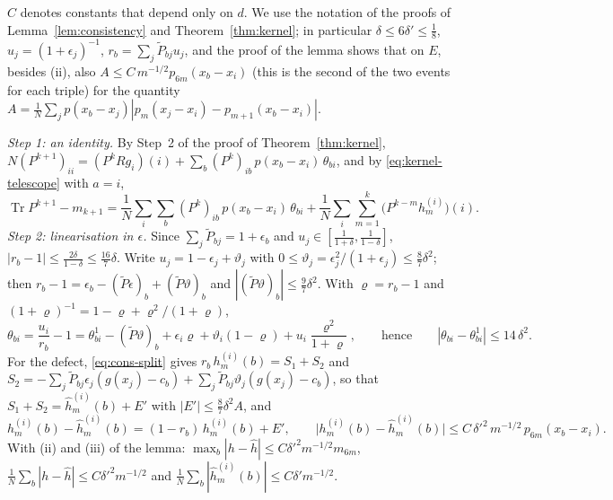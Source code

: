 \documentclass[11pt,a4paper]{article}
\makeatletter
\theoremstyle{stmt}
\theoremstyle{defn}
\theoremstyle{rmk}
\renewenvironment{proof}[1][\proofname]{\par\pushQED{\qed}\normalfont\topsep6\p@\@plus6\p@\relax
  \trivlist\item[\hskip\labelsep{\sffamily\itshape\small #1.}]\ignorespaces}{\popQED\endtrivlist\@endpefalse}
\numberwithin{equation}{section}
\DeclareMathOperator{\Tr}{Tr}
\makeatother
\begin{document}
{\begin{proof}
$C$ denotes constants that depend only on $d$. We use the notation of the proofs of Lemma~\ref{lem:consistency} and Theorem~\ref{thm:kernel}; in particular $\delta\le6\delta'\le\frac18$, $u_j=(1+\epsilon_j)^{-1}$, $r_b=\sum_j\tilde P_{bj}u_j$, and the proof of the lemma shows that on $E$, besides (ii), also $A\le C\,m^{-1/2}p_{6m}(x_b-x_i)$ (this is the second of the two events for each triple) for the quantity $A=\frac1N\sum_jp(x_b-x_j)|p_m(x_j-x_i)-p_{m+1}(x_b-x_i)|$.

\emph{Step 1: an identity.} By Step~2 of the proof of Theorem~\ref{thm:kernel}, $N(P^{k+1})_{ii}=(P^kRg_i)(i)+\sum_b(P^k)_{ib}\,p(x_b-x_i)\,\theta_{bi}$, and by \eqref{eq:kernel-telescope} with $a=i$,
\[
\Tr P^{k+1}-m_{k+1}=\frac1N\sum_i\sum_b(P^k)_{ib}\,p(x_b-x_i)\,\theta_{bi}+\frac1N\sum_i\sum_{m=1}^k\big(P^{k-m}h^{(i)}_m\big)(i).
\]
\emph{Step 2: linearisation in $\epsilon$.} Since $\sum_j\tilde P_{bj}=1+\epsilon_b$ and $u_j\in[\frac1{1+\delta},\frac1{1-\delta}]$, $|r_b-1|\le\frac{2\delta}{1-\delta}\le\frac{16}7\delta$. Write $u_j=1-\epsilon_j+\vartheta_j$ with $0\le\vartheta_j=\epsilon_j^2/(1+\epsilon_j)\le\frac87\delta^2$; then $r_b-1=\epsilon_b-(\tilde P\epsilon)_b+(\tilde P\vartheta)_b$ and $|(\tilde P\vartheta)_b|\le\frac97\delta^2$. With $\varrho=r_b-1$ and $(1+\varrho)^{-1}=1-\varrho+\varrho^2/(1+\varrho)$,
\[
\theta_{bi}=\frac{u_i}{r_b}-1=\theta^1_{bi}-(\tilde P\vartheta)_b+\epsilon_i\varrho+\vartheta_i(1-\varrho)+u_i\frac{\varrho^2}{1+\varrho},\qquad\text{hence}\qquad|\theta_{bi}-\theta^1_{bi}|\le14\,\delta^2 .
\]
For the defect, \eqref{eq:cons-split} gives $r_b\,h^{(i)}_m(b)=S_1+S_2$ and $S_2=-\sum_j\tilde P_{bj}\epsilon_j(g(x_j)-c_b)+\sum_j\tilde P_{bj}\vartheta_j(g(x_j)-c_b)$, so that $S_1+S_2=\hat h^{(i)}_m(b)+E'$ with $|E'|\le\frac87\delta^2A$, and
\[
h^{(i)}_m(b)-\hat h^{(i)}_m(b)=(1-r_b)\,h^{(i)}_m(b)+E',\qquad\big|h^{(i)}_m(b)-\hat h^{(i)}_m(b)\big|\le C\,\delta'^2\,m^{-1/2}\,p_{6m}(x_b-x_i).
\]
With (ii) and (iii) of the lemma: $\max_b|h-\hat h|\le C\delta'^2m^{-1/2}m_{6m}$, $\frac1N\sum_b|h-\hat h|\le C\delta'^2m^{-1/2}$ and $\frac1N\sum_b|\hat h^{(i)}_m(b)|\le C\delta'm^{-1/2}$.


\end{proof}}
\end{document}

